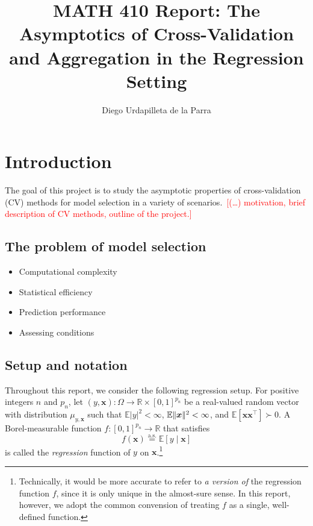 \documentclass[11pt, letter paper]{article}
\title{MATH 410 Report: The Asymptotics of Cross-Validation and Aggregation in the Regression Setting}
\author{Diego Urdapilleta de la Parra}
\newcommand{\1}{\mathmybb{1}}
\newcommand{\R}{\mathbb{R}}
\newcommand{\0}{\emptyset}
\newcommand{\E}{\mathbb{E}}
\newcommand{\Ep}[1]{\mathbb{E}\left[ #1 \right]}
\newcommand{\norm}[1]{|\hspace{-1pt}|#1 |\hspace{-1pt}|}
\newcommand{\normsq}[1]{\norm{#1}^{2}}
\newcommand{\aseq}{\stackrel{\mathrm{a.s.}}{=}}
\newcommand{\x}{\boldsymbol{x}}
\begin{document}
\maketitle
\tableofcontents

\newpage
\section{Introduction}

The goal of this project is to study the asymptotic properties of cross-validation (CV) methods for model selection in a variety of scenarios.~\textcolor{red}{[(\ldots) motivation, brief description of CV methods, outline of the project.]}

\subsection{The problem of model selection}
\begin{itemize}
    \item Computational complexity
    \item Statistical efficiency
    \item Prediction performance
    \item Assessing conditions
\end{itemize}

\subsection{Setup and notation}\label{sec:setup}

Throughout this report, we consider the following regression setup. For positive integers \(n\) and \(p_{n}\), let \((y, \x):\Omega\to\R\times[0,1]^{p_{n}}\) be a real-valued random vector with distribution \(\mu_{y, \x}\) such that \(\E{|y|^{2}}<\infty\), \(\E\normsq{\x}<\infty\), and \(\Ep{\x\x^{\top}}\succ 0\). A Borel-measurable function \(f:[0,1]^{p_{n}} \to \R\) that satisfies
\begin{equation}\label{eq:setup}
    f(\x) \aseq \Ep{y\mid \x}
\end{equation}
is called the \emph{regression} function of \(y\) on \(\x\).\footnote{Technically, it would be more accurate to refer to \emph{a version of} the regression function \(f\), since it is only unique in the almost-sure sense. In this report, however, we adopt the common convension of treating \(f\) as a single, well-defined function.}
\end{document}
